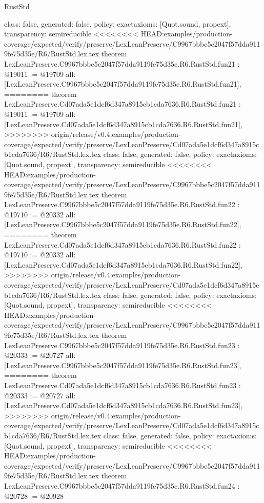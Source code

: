 \begin{lexlean}{RustStd}
\begin{coremodule}
{\begin{coremodule}
{{{{{{{{{{{{{{{{{{{{{{{{  class: false,
  generated: false,
  policy: exact{axioms: [Quot.sound, propext]},
  transparency: semireducible
}
<<<<<<<< HEAD:examples/production-coverage/expected/verify/preserve/LexLeanPreserve/C9967bbbe5c2047f57dda9119fe75d35e/R6/RustStd.lex.tex
theorem LexLeanPreserve.C9967bbbe5c2047f57dda9119fe75d35e.R6.RustStd.fun21 : @19011 := @19709 {
  all: [LexLeanPreserve.C9967bbbe5c2047f57dda9119fe75d35e.R6.RustStd.fun21],
========
theorem LexLeanPreserve.Cd07ada5e1dcf6d347a8915cb1cda7636.R6.RustStd.fun21 : @19011 := @19709 {
  all: [LexLeanPreserve.Cd07ada5e1dcf6d347a8915cb1cda7636.R6.RustStd.fun21],
>>>>>>>> origin/release/v0.4:examples/production-coverage/expected/verify/preserve/LexLeanPreserve/Cd07ada5e1dcf6d347a8915cb1cda7636/R6/RustStd.lex.tex
  class: false,
  generated: false,
  policy: exact{axioms: [Quot.sound, propext]},
  transparency: semireducible
}
<<<<<<<< HEAD:examples/production-coverage/expected/verify/preserve/LexLeanPreserve/C9967bbbe5c2047f57dda9119fe75d35e/R6/RustStd.lex.tex
theorem LexLeanPreserve.C9967bbbe5c2047f57dda9119fe75d35e.R6.RustStd.fun22 : @19710 := @20332 {
  all: [LexLeanPreserve.C9967bbbe5c2047f57dda9119fe75d35e.R6.RustStd.fun22],
========
theorem LexLeanPreserve.Cd07ada5e1dcf6d347a8915cb1cda7636.R6.RustStd.fun22 : @19710 := @20332 {
  all: [LexLeanPreserve.Cd07ada5e1dcf6d347a8915cb1cda7636.R6.RustStd.fun22],
>>>>>>>> origin/release/v0.4:examples/production-coverage/expected/verify/preserve/LexLeanPreserve/Cd07ada5e1dcf6d347a8915cb1cda7636/R6/RustStd.lex.tex
  class: false,
  generated: false,
  policy: exact{axioms: [Quot.sound, propext]},
  transparency: semireducible
}
<<<<<<<< HEAD:examples/production-coverage/expected/verify/preserve/LexLeanPreserve/C9967bbbe5c2047f57dda9119fe75d35e/R6/RustStd.lex.tex
theorem LexLeanPreserve.C9967bbbe5c2047f57dda9119fe75d35e.R6.RustStd.fun23 : @20333 := @20727 {
  all: [LexLeanPreserve.C9967bbbe5c2047f57dda9119fe75d35e.R6.RustStd.fun23],
========
theorem LexLeanPreserve.Cd07ada5e1dcf6d347a8915cb1cda7636.R6.RustStd.fun23 : @20333 := @20727 {
  all: [LexLeanPreserve.Cd07ada5e1dcf6d347a8915cb1cda7636.R6.RustStd.fun23],
>>>>>>>> origin/release/v0.4:examples/production-coverage/expected/verify/preserve/LexLeanPreserve/Cd07ada5e1dcf6d347a8915cb1cda7636/R6/RustStd.lex.tex
  class: false,
  generated: false,
  policy: exact{axioms: [Quot.sound, propext]},
  transparency: semireducible
}
<<<<<<<< HEAD:examples/production-coverage/expected/verify/preserve/LexLeanPreserve/C9967bbbe5c2047f57dda9119fe75d35e/R6/RustStd.lex.tex
theorem LexLeanPreserve.C9967bbbe5c2047f57dda9119fe75d35e.R6.RustStd.fun24 : @20728 := @20928 {
}}}}}}}}}}}}}}}}}}}}}}}}}}}
\end{coremodule}}
\end{coremodule}
\end{lexlean}

